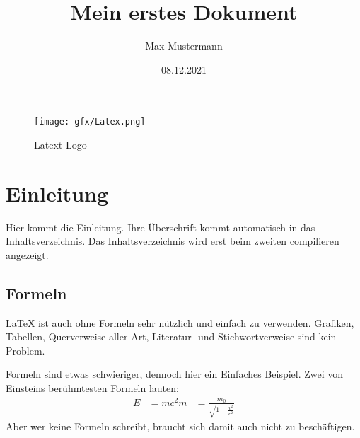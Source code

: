 \documentclass[a4paper,10pt]{scrartcl}
\title{Mein erstes Dokument}
\author{Max Mustermann}
\date{08.12.2021}
\begin{document}
\maketitle

\begin{figure}[h]
\begin{center}
\texttt{[image: gfx/Latex.png]}
\caption{Latext Logo}
\label{latex_logo}
\end{center}
\end{figure}

\tableofcontents


\section{Einleitung}
Hier kommt die Einleitung. Ihre Überschrift kommt automatisch in das Inhaltsverzeichnis. Das Inhaltsverzeichnis wird erst beim zweiten compilieren angezeigt.

\subsection{Formeln}
\LaTeX{} ist auch ohne Formeln sehr nützlich und einfach zu verwenden. Grafiken, Tabellen, Querverweise aller Art, Literatur- und Stichwortverweise sind kein Problem.

Formeln sind etwas schwieriger, dennoch hier ein Einfaches Beispiel. Zwei von Einsteins berühmtesten Formeln lauten:
\begin{align}
E &= mc^2
m &= \frac{m_0}{\sqrt{1-\frac{v^2}{c^2}}}
\end{align}
Aber wer keine Formeln schreibt, braucht sich damit auch nicht zu beschäftigen.
\end{document}
